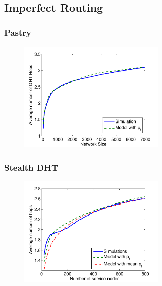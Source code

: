 \documentclass[xcolor=pdftex,dvipsnames,table]{beamer}
\begin{document}
\subsection{Imperfect Routing}
\begin{frame}
   \frametitle{Pastry}
  \begin{center}
    \begin{figure}%
       \includegraphics[width=7cm]{pdfplots/val_past2.pdf}
    \end{figure} \end{center}
\end{frame}

\begin{frame}
   \frametitle{Stealth DHT}
  \begin{center}
    \begin{figure}%
        \includegraphics[width=7cm]{pdfplots/val_stealth1.pdf}
    \end{figure} \end{center}
\end{frame}


\end{document}
